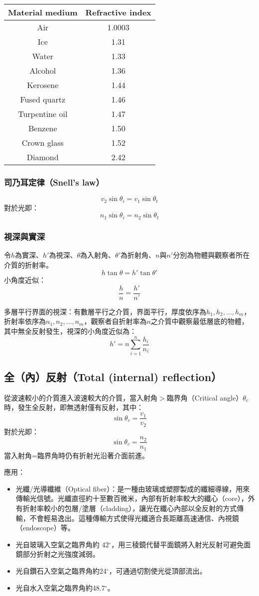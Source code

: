 \documentclass[a4paper,12pt]{report}
\begin{document}
\begin{longtable}{|c|c|}
\hline
Material medium & Refractive index\\\hline\endhead
Air & 1.0003\\\hline
Ice & 1.31\\\hline
Water & 1.33\\\hline
Alcohol & 1.36\\\hline
Kerosene & 1.44\\\hline
Fused quartz & 1.46\\\hline
Turpentine oil & 1.47\\\hline
Benzene & 1.50\\\hline
Crown glass & 1.52\\\hline
Diamond & 2.42\\\hline
\end{longtable}
\FB
\subsubsection{司乃耳定律（Snell's law）}
\[v_2 \sin \theta_i = v_1 \sin \theta_t \]
對於光即：
\[n_1 \sin \theta_i = n_2 \sin \theta_t \]
\subsubsection{視深與實深}
令$h$為實深、$h'$為視深、$\theta$為入射角、$\theta'$為折射角、$n$與$n'$分別為物體與觀察者所在介質的折射率。
\[h\tan\theta=h'\tan\theta'\]
小角度近似：
\[\frac{h}{n}=\frac{h'}{n'}\]

多層平行界面的視深：有數層平行之介質，界面平行，厚度依序為$h_1, h_2, \ldots, h_m$，折射率依序為$n_1, n_2, \ldots, n_m$，觀察者自折射率為$n$之介質中觀察最低層底的物體，其中無全反射發生，視深的小角度近似為：
\[h'=n\sum_{i=1}^n\frac{h_i}{n_i}\]
\subsection{全（內）反射（Total (internal) reflection）}
從波速較小的介質進入波速較大的介質，當入射角$>$臨界角（Critical angle）$\theta_c$時，發生全反射，即無透射僅有反射，其中：
\[ \sin \theta_c = \frac{v_1}{v_2} \]
對於光即：
\[ \sin \theta_c = \frac{n_2}{n_1} \]
當入射角=臨界角時仍有折射光沿著介面前進。

應用：
\begin{itemize}
\item 光纖/光導纖維（Optical fiber）：是一種由玻璃或塑膠製成的纖細導線，用來傳輸光信號。光纖直徑約十至數百微米，內部有折射率較大的纖心（core），外有折射率較小的包層/塗層（cladding），讓光在纖心內部以全反射的方式傳輸，不會輕易逸出。這種傳輸方式使得光纖適合長距離高速通信、內視鏡（endoscope）等。
\item 光自玻璃入空氣之臨界角約 42$^\circ$，用三稜鏡代替平面鏡將入射光反射可避免面鏡部分折射之光強度減弱。
\item 光自鑽石入空氣之臨界角約24$^\circ$，可通過切割使光從頂部流出。
\item 光自水入空氣之臨界角約48.7$^\circ$。
\end{itemize}
\end{document}
